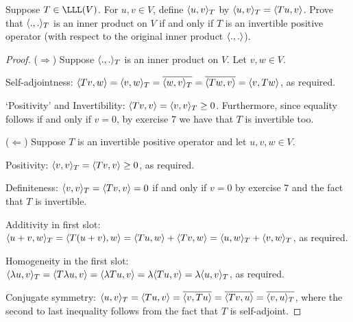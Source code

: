 \begin{exercise}{8}
  Suppose $T\in\LLL(V)$. For $u,v\in V$, define $\langle u,v\rangle_T$ by $\langle u,v\rangle_T=\langle Tu,v\rangle$. Prove that $\langle .,.\rangle_T$ is an inner product on $V$ if and only if $T$ is an invertible positive operator (with respect to the original inner product $\langle .,.\rangle$).
\end{exercise}
\begin{proof}
 ($\Rightarrow$) Suppose $\langle .,.\rangle_T$ is an inner product on $V$. Let $v, w\in V$.

 Self-adjointness: $\langle Tv,w\rangle =\langle v,w\rangle_T =\overline{\langle w,v\rangle_T} =\overline{\langle Tw,v\rangle} =\langle v,Tw\rangle$, as required.

 `Positivity' and Invertibility: $\langle Tv,v\rangle =\langle v,v\rangle_T\geq 0$. Furthermore, since equality follows if and only if $v=0$, by exercise 7 we have that $T$ is invertible too.

 ($\Leftarrow$) Suppose $T$ is an invertible positive operator and let $u,v,w\in V$.

 Positivity: $\langle v,v\rangle_T =\langle Tv,v\rangle\geq 0$, as required.

 Definiteness: $\langle v,v\rangle_T =\langle Tv,v\rangle =0$ if and only if $v=0$ by exercise 7 and the fact that $T$ is invertible.

 Additivity in first slot: $\langle u+v,w\rangle_T =\langle T(u+v),w\rangle =\langle Tu,w\rangle+\langle Tv,w\rangle =\langle u,w\rangle_T+\langle v,w\rangle_T$, as required.

 Homogeneity in the first slot: $\langle \lambda u,v\rangle_T =\langle T\lambda u,v\rangle =\langle \lambda Tu,v\rangle =\lambda\langle Tu,v\rangle =\lambda\langle u,v\rangle_T$, as required.

 Conjugate symmetry: $\langle u,v\rangle_T =\langle Tu,v\rangle =\overline{\langle v,Tu\rangle} =\overline{\langle Tv,u\rangle} =\overline{\langle v,u\rangle_T}$, where the second to last inequality follows from the fact that $T$ is self-adjoint.
\end{proof}

